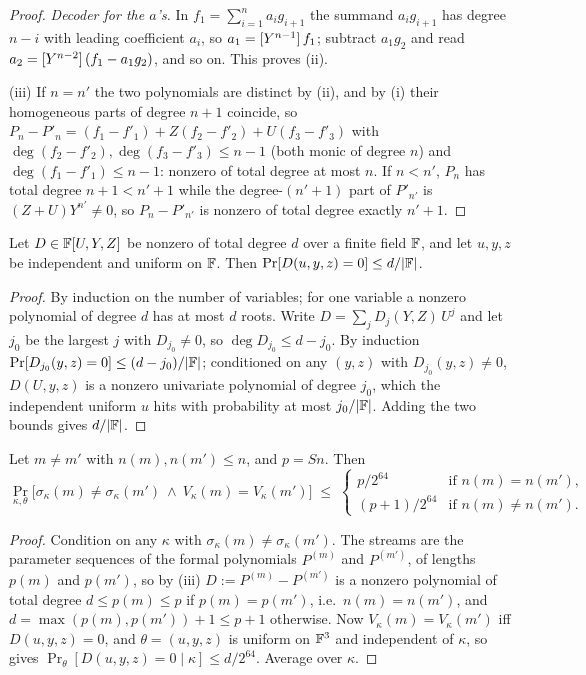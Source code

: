\begin{proof}
\emph{Decoder for the $a$'s.}  In $f_1=\sum_{i=1}^{n}a_ig_{i+1}$ the summand
$a_ig_{i+1}$ has degree $n-i$ with leading coefficient $a_i$, so
$a_1=[Y^{n-1}]\,f_1$; subtract $a_1g_2$ and read $a_2=[Y^{n-2}]\,(f_1-a_1g_2)$,
and so on.  This proves (ii).

(iii) If $n=n'$ the two polynomials are distinct by (ii), and by (i) their
homogeneous parts of degree $n+1$ coincide, so
$P_n-P'_n=(f_1-f'_1)+Z(f_2-f'_2)+U(f_3-f'_3)$ with
$\deg(f_2-f'_2),\deg(f_3-f'_3)\le n-1$ (both monic of degree $n$) and
$\deg(f_1-f'_1)\le n-1$: nonzero of total degree at most $n$.  If $n<n'$,
$P_n$ has total degree $n+1<n'+1$ while the degree-$(n'+1)$ part of $P'_{n'}$
is $(Z+U)Y^{n'}\ne0$, so $P_n-P'_{n'}$ is nonzero of total degree exactly
$n'+1$.
\end{proof}

\begin{lemma}\label{lem:ph:sz}
Let $D\in\mathbb{F}[U,Y,Z]$ be nonzero of total degree $d$ over a finite field $\mathbb{F}$,
and let $u,y,z$ be independent and uniform on $\mathbb{F}$.  Then
$\Pr[D(u,y,z)=0]\le d/|\mathbb{F}|$.
\end{lemma}
\begin{proof}
By induction on the number of variables; for one variable a nonzero
polynomial of degree $d$ has at most $d$ roots.  Write
$D=\sum_{j}D_j(Y,Z)\,U^j$ and let $j_0$ be the largest $j$ with $D_{j_0}\ne0$,
so $\deg D_{j_0}\le d-j_0$.  By induction $\Pr[D_{j_0}(y,z)=0]\le(d-j_0)/|\mathbb{F}|$;
conditioned on any $(y,z)$ with $D_{j_0}(y,z)\ne0$, $D(U,y,z)$ is a nonzero
univariate polynomial of degree $j_0$, which the independent uniform $u$
hits with probability at most $j_0/|\mathbb{F}|$.  Adding the two bounds gives
$d/|\mathbb{F}|$.
\end{proof}

\begin{lemma}\label{lem:ph:level2}
Let $m\ne m'$ with $n(m),n(m')\le n$, and $p=Sn$.  Then
\[
  \Pr_{\kappa,\theta}\bigl[\sigma_\kappa(m)\ne\sigma_\kappa(m')\ \wedge\ V_\kappa(m)=V_\kappa(m')\bigr]
  \;\le\;\begin{cases}
     p/2^{64} & \text{if } n(m)=n(m'),\\
     (p+1)/2^{64} & \text{if } n(m)\ne n(m').
  \end{cases}
\]
\end{lemma}
\begin{proof}
Condition on any $\kappa$ with $\sigma_\kappa(m)\ne\sigma_\kappa(m')$.  The
streams are the parameter sequences of the formal polynomials $P^{(m)}$ and
$P^{(m')}$, of lengths $p(m)$ and $p(m')$, so by (iii)
$D:=P^{(m)}-P^{(m')}$ is a nonzero polynomial of total degree $d\le p(m)\le p$
if $p(m)=p(m')$, i.e.\ $n(m)=n(m')$, and $d=\max(p(m),p(m'))+1\le p+1$
otherwise.  Now $V_\kappa(m)=V_\kappa(m')$ iff $D(u,y,z)=0$, and
$\theta=(u,y,z)$ is uniform on $\mathbb{F}^3$ and independent of $\kappa$, so
 gives $\Pr_\theta[D(u,y,z)=0\mid\kappa]\le d/2^{64}$.
Average over $\kappa$.
\end{proof}

